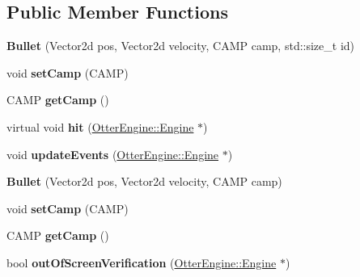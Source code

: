 \subsection*{Public Member Functions}
\begin{DoxyCompactItemize}
\item 
{\bfseries Bullet} (Vector2d pos, Vector2d velocity, C\+A\+MP camp, std\+::size\+\_\+t id)\hypertarget{class_bullet_a6cdcd55c378f0d80062b5405b0a93e4f}{}\label{class_bullet_a6cdcd55c378f0d80062b5405b0a93e4f}

\item 
void {\bfseries set\+Camp} (C\+A\+MP)\hypertarget{class_bullet_a186c9b6ec673e1831756b5a2bc14d773}{}\label{class_bullet_a186c9b6ec673e1831756b5a2bc14d773}

\item 
C\+A\+MP {\bfseries get\+Camp} ()\hypertarget{class_bullet_ae08dc6092ebc665f64a718a33078333b}{}\label{class_bullet_ae08dc6092ebc665f64a718a33078333b}

\item 
virtual void {\bfseries hit} (\hyperlink{class_otter_engine_1_1_engine}{Otter\+Engine\+::\+Engine} $\ast$)\hypertarget{class_bullet_a162222b48e604d34111a3b33e832b37a}{}\label{class_bullet_a162222b48e604d34111a3b33e832b37a}

\item 
void {\bfseries update\+Events} (\hyperlink{class_otter_engine_1_1_engine}{Otter\+Engine\+::\+Engine} $\ast$)\hypertarget{class_bullet_a6287ae6167d56c156bcf5eab78c763ab}{}\label{class_bullet_a6287ae6167d56c156bcf5eab78c763ab}

\item 
{\bfseries Bullet} (Vector2d pos, Vector2d velocity, C\+A\+MP camp)\hypertarget{class_bullet_abed34f3514a63b4c2cca7295e39c9b3f}{}\label{class_bullet_abed34f3514a63b4c2cca7295e39c9b3f}

\item 
void {\bfseries set\+Camp} (C\+A\+MP)\hypertarget{class_bullet_a186c9b6ec673e1831756b5a2bc14d773}{}\label{class_bullet_a186c9b6ec673e1831756b5a2bc14d773}

\item 
C\+A\+MP {\bfseries get\+Camp} ()\hypertarget{class_bullet_ae08dc6092ebc665f64a718a33078333b}{}\label{class_bullet_ae08dc6092ebc665f64a718a33078333b}

\item 
bool {\bfseries out\+Of\+Screen\+Verification} (\hyperlink{class_otter_engine_1_1_engine}{Otter\+Engine\+::\+Engine} $\ast$)\hypertarget{class_bullet_ac638312c4149307f520a37aac91e9e6b}{}\label{class_bullet_ac638312c4149307f520a37aac91e9e6b}


\end{DoxyCompactItemize}
